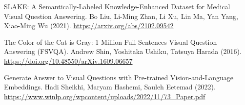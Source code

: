 \documentclass{adonis}
\begin{document}
	

	
	
	\begin{thebibliography}{5}
		SLAKE: A Semantically-Labeled Knowledge-Enhanced Dataset for Medical Visual Question Answering. Bo Liu, Li-Ming Zhan, Li Xu, Lin Ma, Yan Yang, Xiao-Ming Wu (2021). \url{https://arxiv.org/abs/2102.09542}

		The Color of the Cat is Gray: 1 Million Full-Sentences Visual Question Answering (FSVQA). Andrew Shin, Yoshitaka Ushiku, Tatsuya Harada (2016). \url{https://doi.org/10.48550/arXiv.1609.06657}
	

		Generate Answer to Visual Questions with Pre-trained
Vision-and-Language Embeddings. Hadi Sheikhi, Maryam Hashemi, Sauleh Eetemad (2022). \url{https://www.winlp.org/wpcontent/uploads/2022/11/73_Paper.pdf}
	\end{thebibliography}
	
\end{document}
